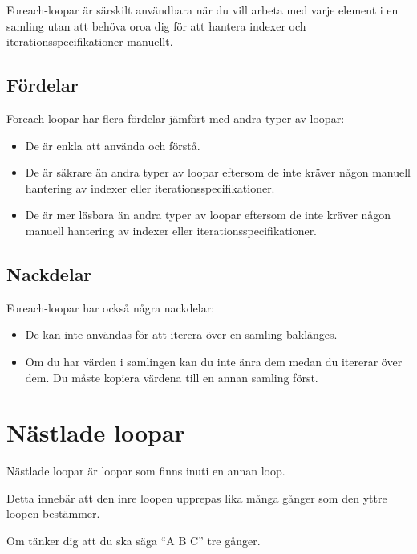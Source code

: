Foreach-loopar är särskilt användbara när du vill arbeta med varje
element i en samling utan att behöva oroa dig för att hantera indexer
och iterationsspecifikationer manuellt.

\hypertarget{fuxf6rdelar}{%
\subsection{Fördelar}\label{fuxf6rdelar}}

Foreach-loopar har flera fördelar jämfört med andra typer av loopar:

\begin{itemize}
\tightlist
\item
  De är enkla att använda och förstå.
\item
  De är säkrare än andra typer av loopar eftersom de inte kräver någon
  manuell hantering av indexer eller iterationsspecifikationer.
\item
  De är mer läsbara än andra typer av loopar eftersom de inte kräver
  någon manuell hantering av indexer eller iterationsspecifikationer.
\end{itemize}

\hypertarget{nackdelar}{%
\subsection{Nackdelar}\label{nackdelar}}

Foreach-loopar har också några nackdelar:

\begin{itemize}
\tightlist
\item
  De kan inte användas för att iterera över en samling baklänges.
\item
  Om du har värden i samlingen kan du inte änra dem medan du itererar
  över dem. Du måste kopiera värdena till en annan samling först.
\end{itemize}

\hypertarget{nuxe4stlade-loopar}{%
\section{Nästlade loopar}\label{nuxe4stlade-loopar}}

Nästlade loopar är loopar som finns inuti en annan loop.

Detta innebär att den inre loopen upprepas lika många gånger som den
yttre loopen bestämmer.

Om tänker dig att du ska säga ``A B C'' tre gånger.

